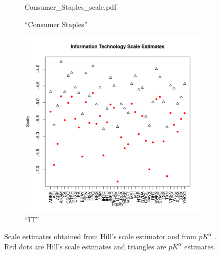 \documentclass{article}
\begin{document}
\begin{figure}[htb!]
\begin{subfigure}[b]{0.32\linewidth}
                    {Consumer_Staples_scale.pdf}
                    \caption{``Consumer Staples''}
                    \label{fig:Consumer_Staples_scale}
  \end{subfigure}
  \begin{subfigure}[b]{0.32\linewidth}
    \includegraphics[width=\textwidth]
                    {Information_Technology_scale.pdf}
                    \caption{``IT''}
                    \label{fig:Information_Technology_scale}
  \end{subfigure}
  \caption{\small Scale estimates obtained from Hill's scale estimator
    and from $p K^\alpha$ . Red dots are Hill's scale estimates and
    triangles are $p K^\alpha$ estimates.
  }
\end{figure}



\end{document}
